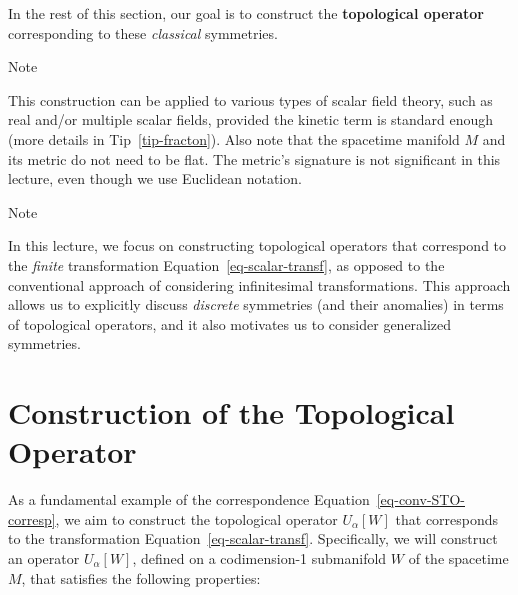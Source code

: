 \documentclass[11pt,toc=bibliography]{scrbook}
\numberwithin{equation}{section}
\begin{document}
In the rest of this section, our goal is to construct the
\textbf{topological operator} corresponding to these \emph{classical}
symmetries.

\begin{note}{Note}

This construction can be applied to various types of scalar field
theory, such as real and/or multiple scalar fields, provided the kinetic
term is standard enough (more details in Tip~\ref{tip-fracton}). Also
note that the spacetime manifold \(M\) and its metric do not need to be
flat. The metric's signature is not significant in this lecture, even
though we use Euclidean notation.

\end{note}

\begin{note}{Note}

In this lecture, we focus on constructing topological operators that
correspond to the \emph{finite} transformation
Equation~\ref{eq-scalar-transf}, as opposed to the conventional approach
of considering infinitesimal transformations. This approach allows us to
explicitly discuss \emph{discrete} symmetries (and their anomalies) in
terms of topological operators, and it also motivates us to consider
generalized symmetries.

\end{note}

\section{Construction of the Topological
Operator}\label{construction-of-the-topological-operator}

As a fundamental example of the correspondence
Equation~\ref{eq-conv-STO-corresp}, we aim to construct the topological
operator \(U_\alpha[W]\) that corresponds to the transformation
Equation~\ref{eq-scalar-transf}. Specifically, we will construct an
operator \(U_\alpha[W]\), defined on a codimension-1 submanifold \(W\)
of the spacetime \(M\), that satisfies the following properties:
\end{document}
